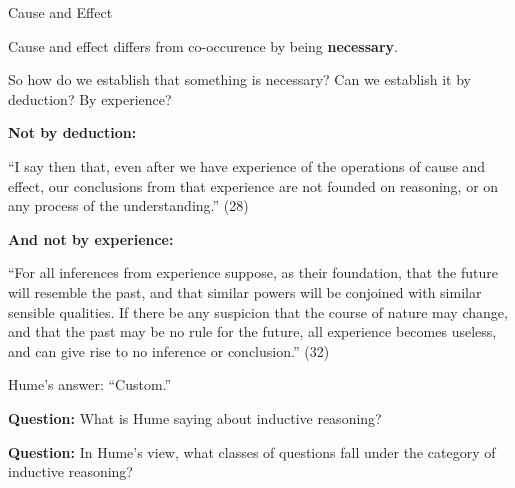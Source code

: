 \documentclass[8pt]{beamer}\usepackage[]{graphicx}\usepackage[]{color}
\begin{document}
\begin{frame}{Cause and Effect}

Cause and effect differs from co-occurence by being \textbf{necessary}.

So how do we establish that something is necessary?  Can we establish
it by deduction?  By experience?

\pause
\textbf{Not by deduction:}

\begin{addmargin}[2em]{2em}%
``I say then that, even after we have experience of the operations of
cause and effect, our conclusions from that experience are not founded
on reasoning, or on any process of the understanding.''  (28)
\end{addmargin}

\pause
\textbf{And not by experience:}
\begin{addmargin}[2em]{2em}%
``For all inferences from experience suppose, as their foundation, that
the future will resemble the past, and that similar powers will be conjoined
with similar sensible qualities.  If there be any suspicion that the course
of nature may change, and that the past may be no rule for the future,
all experience becomes useless, and can give rise to no inference
or conclusion.'' (32)
\end{addmargin}

\pause
Hume's answer: ``Custom.''

\pause

\textbf{Question:}  What is Hume saying about inductive reasoning?

\textbf{Question:}  In Hume's view, what classes of questions fall
under the category of inductive reasoning?

\end{frame}


\end{document}
